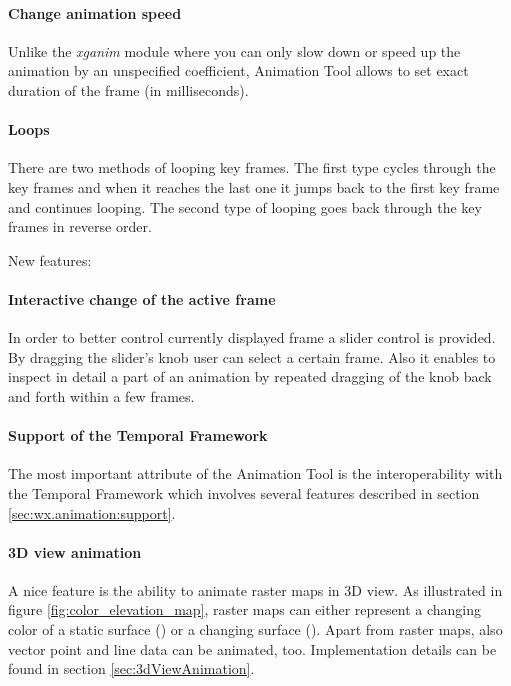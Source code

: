 \documentclass[a4paper,12pt,oneside]{book}
\newcommand{\module}[1]{\textsl{#1}}
\newcommand{\tf}{Temporal Framework\xspace}
\newcommand{\at}{Animation Tool\xspace}
\begin{document}
\paragraph{Change animation speed}
Unlike the \module{xganim} module where you can only
slow down or speed up the animation by an unspecified coefficient, \at allows to set
exact duration of the frame (in milliseconds).
\paragraph{Loops}
There are two methods of looping key frames.
The first type cycles through the key frames and when it reaches the last one it jumps back
to the first key frame and continues looping.
The second type of looping goes back through the key frames in reverse order.


New features:
\paragraph{Interactive change of the active frame}
In order to better control currently displayed frame a slider control is provided.
By dragging the slider's knob user can select a certain frame.
Also it enables to inspect in detail a part of an animation
by repeated dragging of the knob back and forth within a few frames.
      
\paragraph{Support of the \tf}
The most important attribute of the \at is the interoperability with the \tf
which involves several features described in section \ref{sec:wx.animation:support}.
      

\paragraph{3D view animation}
A nice feature is the ability to animate raster maps in 3D view.
As illustrated in figure \ref{fig:color_elevation_map},
raster maps can either represent a changing color of a static surface () or
a changing surface ().
Apart from raster maps, also vector point and line data can be animated, too.
Implementation details can be found in section \ref{sec:3dViewAnimation}.
\end{document}
